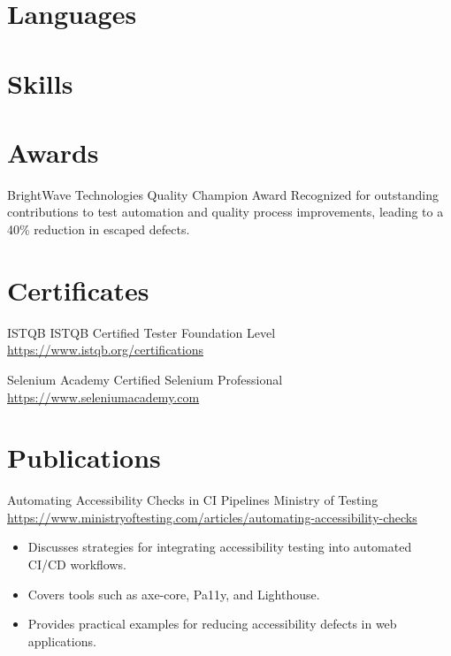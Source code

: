 \documentclass[a4paper, serif, 10pt]{moderncv}
\begin{document}
\section{Languages}

\section{Skills}

\section{Awards}

        {BrightWave Technologies}
        {Quality Champion Award}
        {}
        {}
        {Recognized for outstanding contributions to test automation and quality process improvements, leading to a 40\% reduction in escaped defects.}
\section{Certificates}

        {ISTQB}
        {ISTQB Certified Tester Foundation Level}
        {\url{https://www.istqb.org/certifications}}
        {}
        {}

        {Selenium Academy}
        {Certified Selenium Professional}
        {\url{https://www.seleniumacademy.com}}
        {}
        {}
\section{Publications}

        {Automating Accessibility Checks in CI Pipelines}
        {Ministry of Testing}
        {\url{https://www.ministryoftesting.com/articles/automating-accessibility-checks}}
        {}
        {\begin{itemize}
\item Discusses strategies for integrating accessibility testing into automated CI/CD workflows.
\item Covers tools such as axe-core, Pa11y, and Lighthouse.
\item Provides practical examples for reducing accessibility defects in web applications.
\end{itemize}}
\end{document}
